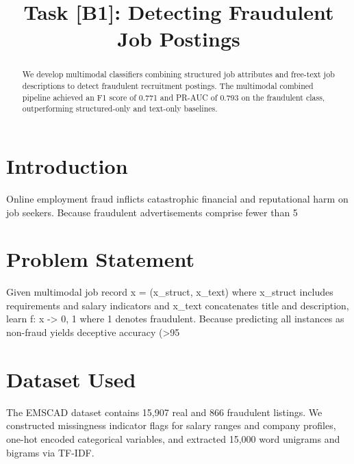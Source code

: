 \documentclass[conference]{IEEEtran}
\begin{document}
\title{Task [B1]: Detecting Fraudulent Job Postings}

\author{
}

\maketitle

\begin{abstract}
We develop multimodal classifiers combining structured job attributes and free-text job descriptions to detect fraudulent recruitment postings. The multimodal combined pipeline achieved an F1 score of 0.771 and PR-AUC of 0.793 on the fraudulent class, outperforming structured-only and text-only baselines.
\end{abstract}

\section{Introduction}
Online employment fraud inflicts catastrophic financial and reputational harm on job seekers. Because fraudulent advertisements comprise fewer than 5%

\section{Problem Statement}
Given multimodal job record x = (x_struct, x_text) where x_struct includes requirements and salary indicators and x_text concatenates title and description, learn f: x -> {0, 1} where 1 denotes fraudulent. Because predicting all instances as non-fraud yields deceptive accuracy (>95%

\section{Dataset Used}
The EMSCAD dataset contains 15,907 real and 866 fraudulent listings. We constructed missingness indicator flags for salary ranges and company profiles, one-hot encoded categorical variables, and extracted 15,000 word unigrams and bigrams via TF-IDF.
\end{document}
